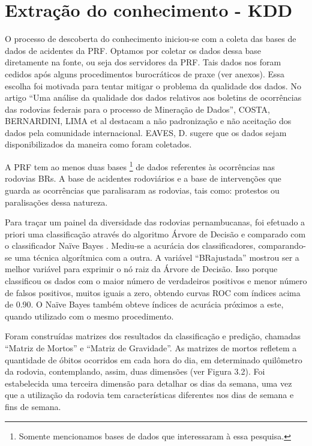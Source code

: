 \section{Extração do conhecimento - KDD}

O processo de descoberta do conhecimento iniciou-se com a coleta das bases de dados de acidentes da PRF. Optamos por coletar os dados dessa base diretamente na fonte,
ou seja dos servidores da PRF. Tais dados nos foram cedidos após alguns procedimentos burocráticos de praxe (ver anexos). Essa escolha foi motivada para tentar
mitigar o problema da qualidade dos dados. No artigo ``Uma análise da qualidade dos dados relativos aos boletins de ocorrências das rodovias federais para o processo de Mineração de Dados'', COSTA, BERNARDINI, LIMA et al \cite{Costa2015} destacam a não padronização e não aceitação dos dados pela comunidade internacional. EAVES, D. \cite{Eaves} sugere que os dados sejam disponibilizados da maneira como foram coletados.

A PRF tem ao menos duas bases \footnote{Somente mencionamos bases de dados que interessaram à essa pesquisa.} de dados referentes às ocorrências nas rodovias BRs. A base de acidentes rodoviários e a base de intervenções que guarda as ocorrências que paralisaram as rodovias, tais como: protestos ou paralisações dessa natureza.

Para traçar um painel da diversidade das rodovias pernambucanas, foi efetuado a priori uma classificação através do algoritmo Árvore de Decisão \cite{thianniwet2010classification} e comparado com o classificador Naïve Bayes \cite{de2011analysis}. Mediu-se a acurácia dos classificadores, comparando-se uma técnica algorítmica com a outra. A variável ``BRajustada'' mostrou ser a melhor variável para exprimir o nó raiz da Árvore de Decisão. Isso porque classificou os dados com o maior número de verdadeiros positivos e menor número de falsos positivos, muitos iguais a zero, obtendo curvas ROC com índices acima de 0.90. O Naïve Bayes também obteve índices de acurácia próximos a este, quando utilizado com o mesmo procedimento.

Foram construídas matrizes dos resultados da classificação e predição, chamadas ``Matriz de Mortos'' e ``Matriz de Gravidade''. As matrizes de mortos refletem a quantidade de óbitos ocorridos em cada hora do dia, em determinado quilômetro da rodovia, contemplando, assim, duas dimensões (ver Figura 3.2). Foi estabelecida uma terceira dimensão para detalhar os dias da semana, uma vez que a utilização da rodovia tem características diferentes nos dias de semana e fins de semana. 

